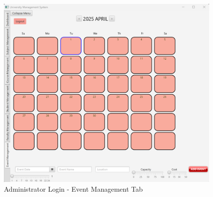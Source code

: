 \begin{figure}[ht]
    \centering
        \centering\includegraphics[width=1\linewidth]{figures/Event_Management.png}
        \caption{Administrator Login - Event Management Tab}
        \label{fig:example10}  
\end{figure}